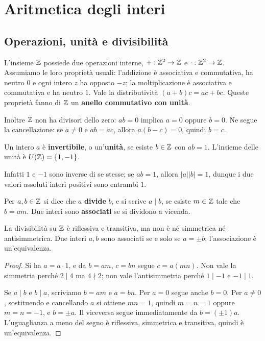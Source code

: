 \chapter{Aritmetica degli interi}\label{cap:interi}

\section{Operazioni, unità e divisibilità}
L'insieme $\mathbb{Z}$ possiede due operazioni interne, $+:\mathbb{Z}^2\to\mathbb{Z}$ e $\cdot:\mathbb{Z}^2\to\mathbb{Z}$. Assumiamo le loro proprietà usuali: l'addizione è associativa e commutativa, ha neutro $0$ e ogni intero $z$ ha opposto $-z$; la moltiplicazione è associativa e commutativa e ha neutro $1$. Vale la distributività $(a+b)c=ac+bc$. Queste proprietà fanno di $\mathbb{Z}$ un \textbf{anello commutativo con unità}.

Inoltre $\mathbb{Z}$ non ha divisori dello zero: $ab=0$ implica $a=0$ oppure $b=0$. Ne segue la cancellazione: se $a\ne0$ e $ab=ac$, allora $a(b-c)=0$, quindi $b=c$.

\begin{definizione}
Un intero $a$ è \textbf{invertibile}, o un'\textbf{unità}, se esiste $b\in\mathbb{Z}$ con $ab=1$. L'insieme delle unità è $U(\mathbb{Z})=\{1,-1\}$.
\end{definizione}
Infatti $1$ e $-1$ sono inverse di se stesse; se $ab=1$, allora $|a||b|=1$, dunque i due valori assoluti interi positivi sono entrambi $1$.

\begin{definizione}
Per $a,b\in\mathbb{Z}$ si dice che $a$ \textbf{divide} $b$, e si scrive $a\mid b$, se esiste $m\in\mathbb{Z}$ tale che $b=am$. Due interi sono \textbf{associati} se si dividono a vicenda.
\end{definizione}

\begin{proposizione}
La divisibilità su $\mathbb{Z}$ è riflessiva e transitiva, ma non è né simmetrica né antisimmetrica. Due interi $a,b$ sono associati se e solo se $a=\pm b$; l'associazione è un'equivalenza.
\end{proposizione}
\begin{proof}
Si ha $a=a\cdot1$, e da $b=am$, $c=bn$ segue $c=a(mn)$. Non vale la simmetria perché $2\mid4$ ma $4\nmid2$; non vale l'antisimmetria perché $1\mid-1$ e $-1\mid1$.

Se $a\mid b$ e $b\mid a$, scriviamo $b=am$ e $a=bn$. Per $a=0$ segue anche $b=0$. Per $a\ne0$, sostituendo e cancellando $a$ si ottiene $mn=1$, quindi $m=n=1$ oppure $m=n=-1$, e $b=\pm a$. Il viceversa segue immediatamente da $b=(\pm1)a$. L'uguaglianza a meno del segno è riflessiva, simmetrica e transitiva, quindi è un'equivalenza.
\end{proof}

